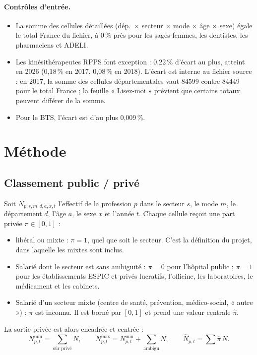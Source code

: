 \paragraph{Contrôles d'entrée.}
\begin{itemize}
  \item La somme des cellules détaillées (dép.~$\times$ secteur $\times$ mode $\times$ âge $\times$ sexe) égale
  le total France du fichier, à 0\,\% près\mesure{} pour les sages-femmes, les dentistes, les pharmaciens et
  ADELI.
  \item Les kinésithérapeutes RPPS font exception : 0,22\,\% d'écart au plus\mesure{}, atteint en 2026 (0,18\,\% en
  2017, 0,08\,\% en 2018). L'écart est interne au fichier source : en 2017, la somme des cellules départementales
  vaut \num{84599} contre \num{84449} pour le total France\mesure{} ; la feuille « Lisez-moi » prévient que
  certains totaux peuvent différer de la somme.
  \item Pour le BTS, l'écart est d'au plus 0,009\,\%\mesure{}.
\end{itemize}

\section{Méthode}
\subsection{Classement public / privé}
Soit $N_{p,s,m,d,a,x,t}$ l'effectif de la profession $p$ dans le secteur $s$, le mode $m$, le département $d$,
l'âge $a$, le sexe $x$ et l'année $t$. Chaque cellule reçoit une part privée $\pi \in [0,1]$ :
\begin{itemize}
  \item libéral ou mixte : $\pi = 1$, quel que soit le secteur. C'est la définition du projet, dans laquelle
  les mixtes sont inclus.
  \item Salarié dont le secteur est sans ambiguïté : $\pi = 0$ pour l'hôpital public ; $\pi = 1$ pour les
  établissements ESPIC et privés lucratifs, l'officine, les laboratoires, le médicament et les cabinets.
  \item Salarié d'un secteur mixte (centre de santé, prévention, médico-social, « autre ») : $\pi$ est inconnu.
  Il est borné par $[0,1]$ et prend une valeur centrale $\hat\pi$.
\end{itemize}
La sortie privée est alors encadrée et centrée :
\begin{equation}
N^{\min}_{p,t} = \sum_{\text{sûr privé}} N, \qquad
N^{\max}_{p,t} = N^{\min}_{p,t} + \sum_{\text{ambigu}} N, \qquad
\hat N_{p,t} = \sum \hat\pi\, N .
\end{equation}

